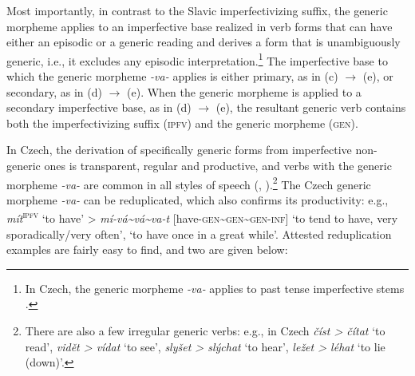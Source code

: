 \documentclass[output=paper,colorlinks,citecolor=brown]{langscibook}
\begin{document}
 

Most importantly, in contrast to the Slavic
imperfectivizing suffix, the generic morpheme applies to an imperfective base realized in verb forms that can have either an episodic or a generic reading and derives a form that is unambiguously generic, i.e., it excludes any episodic interpretation.\footnote{In Czech, the generic morpheme \textit{-va-} applies to past tense imperfective stems \citep[184]{petr1986mluvnice}.} The imperfective
base to which the generic morpheme \textit{-va-} applies
is either primary, as in (c) $\rightarrow$ (e), or secondary, as in (d) $\rightarrow$ (e).
When the generic morpheme is applied to a secondary imperfective base, as in (d) $\rightarrow$ (e), 
the resultant generic verb contains both the imperfectivizing suffix (\textsc{ipfv}) and the generic morpheme (\textsc{gen}).




 

In Czech, the derivation of specifically generic forms from imperfective non-generic ones
is transparent, regular and productive,
and verbs with the generic morpheme \textit{-va-}  are common in all styles of speech (\citealt[177]{kucera1981aspect}, \citealt{petr1986mluvnice}).\footnote{There are also a few irregular generic verbs: e.g., in Czech \textit{číst > čítat} `to read', \textit{vidět > vídat} `to see', \textit{slyšet > slýchat} `to hear', \textit{ležet > léhat} `to lie (down)'.} 
The Czech generic morpheme \textit{-va-} can be reduplicated, which also confirms its productivity: e.g., \textit{mít}\textsuperscript{\textsc{ipfv}} `to have' > \textit{mí-vá{\textasciitilde}vá{\textasciitilde}va-t} [have-\textsc{gen{\textasciitilde}gen{\textasciitilde}gen-inf}] `to tend to have, very sporadically/very often', `to have once in a great while'.
Attested reduplication examples are fairly 
easy to find, and two are given below:
\end{document}
